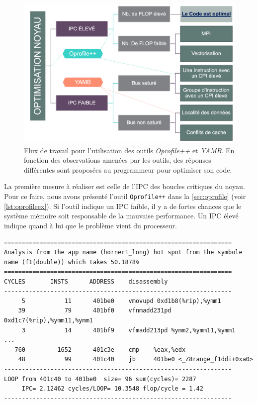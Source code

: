         \begin{figure}
            \center
            \includegraphics[width=12cm]{images/analyse_bigpicture.png}
            \caption{\label{pic:analyse_bigpicture} Flux de travail pour l'utilisation des outils \textit{Oprofile++} et \textit{YAMB}. En fonction des observations amenées par les outils, des réponses différentes sont proposées au programmeur pour optimiser son code.}
        \end{figure}

        La première mesure à réaliser est celle de l'IPC des boucles critiques du noyau. Pour ce faire, nous avons présenté l'outil \verb=Oprofile++= dans la \autoref{sec:oprofile} (voir \autoref{lst:oprofileex}). Si l'outil indique un IPC faible, il y a de fortes chances que le système mémoire soit responsable de la mauvaise performance. Un IPC élevé indique quand à lui que le problème vient du processeur.
        
        \begin{lstlisting}[language={},caption=L'outil \textit{Oprofile++} permet d'extraire le code assembleur et d'y associer le compteur de cycles,label={lst:oprofileex}, 
  frame=tb]
================================================================
Analysis from the app name (horner1_long) hot spot from the symbole name (f1(double)) which takes 50.1878% 
================================================================
CYCLES       INSTS      ADDRESS    disassembly
----------------------------------------------------------------
     5           11      401be0    vmovupd 0xd1b8(%rip),%ymm1
    39           79      401bf0    vfnmadd231pd 0xd1c7(%rip),%ymm11,%ymm1
     3           14      401bf9    vfmadd213pd %ymm2,%ymm11,%ymm1
...
   760         1652      401c3e    cmp    %eax,%edx
    48           99      401c40    jb     401be0 <_Z8range_f1ddi+0xa0>
----------------------------------------------------------------
LOOP from 401c40 to 401be0  size= 96 sum(cycles)= 2287 
     IPC= 2.12462 cycles/LOOP= 10.3548 flop/cycle = 1.42 
----------------------------------------------------------------
\end{lstlisting}

